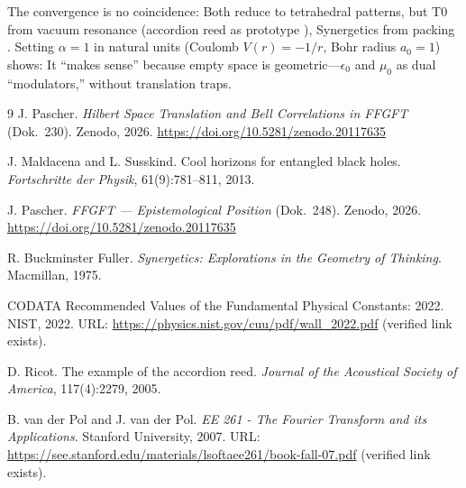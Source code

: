 	The convergence is no coincidence: Both reduce to tetrahedral patterns, but T0 from vacuum resonance (accordion reed as prototype \cite{ricot2005}), Synergetics from packing \cite{fuller1975}. Setting $\alpha=1$ in natural units (Coulomb $V(r) = -1/r$, Bohr radius $a_0 = 1$) shows: It ``makes sense'' because empty space is geometric—$\epsilon_0$ and $\mu_0$ as dual ``modulators,'' without translation traps.
	
	\begin{thebibliography}{9}
	J. Pascher.
	\newblock \emph{Hilbert Space Translation and Bell Correlations in FFGFT} (Dok.~230).
	\newblock Zenodo, 2026.
	\newblock \url{https://doi.org/10.5281/zenodo.20117635}

	J. Maldacena and L. Susskind.
	\newblock Cool horizons for entangled black holes.
	\newblock \emph{Fortschritte der Physik}, 61(9):781--811, 2013.

	J. Pascher.
	\newblock \emph{FFGFT --- Epistemological Position} (Dok.~248).
	\newblock Zenodo, 2026.
	\newblock \url{https://doi.org/10.5281/zenodo.20117635}

		R. Buckminster Fuller.
		\newblock \emph{Synergetics: Explorations in the Geometry of Thinking}.
		\newblock Macmillan, 1975.
		
		CODATA Recommended Values of the Fundamental Physical Constants: 2022.
		\newblock NIST, 2022.
		\newblock URL: \url{https://physics.nist.gov/cuu/pdf/wall_2022.pdf}
		(verified link exists).
		
		D. Ricot.
		\newblock The example of the accordion reed.
		\newblock \emph{Journal of the Acoustical Society of America}, 117(4):2279, 2005.
		
		B. van der Pol and J. van der Pol.
		\newblock \emph{EE 261 - The Fourier Transform and its Applications}.
		\newblock Stanford University, 2007.
		\newblock URL: \url{https://see.stanford.edu/materials/lsoftaee261/book-fall-07.pdf}
		(verified link exists).
	\end{thebibliography}
